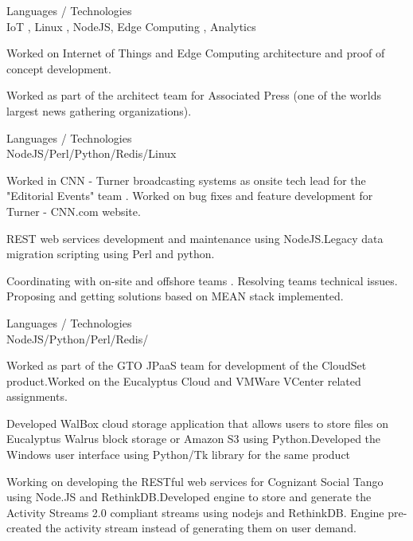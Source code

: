 \documentclass[a4,10pt]{cv4tw}
\begin{document}
{Languages / Technologies \\ IoT , Linux , NodeJS, Edge Computing , Analytics }
	{
	\begin{missions}
		\item Worked on Internet of Things and Edge Computing architecture and proof of concept development.
		\item Worked as part of the architect team for Associated Press (one of the worlds largest news gathering organizations).
	\end{missions}
}

{Languages / Technologies \\ NodeJS/Perl/Python/Redis/Linux}
	{
	\begin{missions}
		\item Worked in CNN - Turner broadcasting systems as onsite tech lead for the "Editorial Events" team . Worked on bug fixes and feature development for Turner - CNN.com website.
		\item REST web services development and maintenance using NodeJS.Legacy data migration scripting using Perl and python.
		\item Coordinating with on-site and offshore teams . Resolving teams technical issues. Proposing and getting solutions based on MEAN stack implemented.
	\end{missions}
}

{Languages / Technologies \\ NodeJS/Python/Perl/Redis/}
	{
	\begin{missions}
		\item Worked as part of the GTO JPaaS team for development of the CloudSet product.Worked on the Eucalyptus Cloud and VMWare VCenter related assignments.
		\item Developed WalBox cloud storage application that allows users to store files on Eucalyptus Walrus block storage or Amazon S3 using Python.Developed the Windows user interface using Python/Tk library for the same product
		\item Working on  developing the RESTful web services for Cognizant Social Tango using Node.JS and RethinkDB.Developed engine to store and generate the Activity Streams 2.0 compliant streams using nodejs and RethinkDB. Engine pre-created the activity stream instead of generating them on user demand.
	\end{missions}
}
\end{document}
